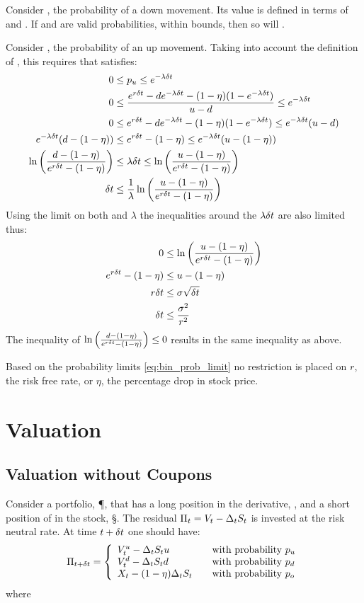 \documentclass[a4paper,11pt,oneside]{report}
\theoremstyle{plain}
\theoremstyle{definition}
\begin{document}
Consider \pd, the probability of a down movement.  Its value is defined in terms of \pu and \po.  If \pu and \po are valid probabilities, within bounds, then so will \pd.

Consider \pu, the probability of an up movement.  Taking into account the definition of \pd, this requires that \pu satisfies:
\begin{align}
 0 &\le p_u \le e^{-\lambda \delta t} \\
 0 &\le \frac{e^{r\delta t} - d e^{-\lambda\delta t} - (1 - \eta)(1 - e^{-\lambda\delta t})}{u - d} \le e^{-\lambda \delta t} \nonumber\\
 0 &\le e^{r\delta t} - d e^{-\lambda\delta t} - (1 - \eta)(1 - e^{-\lambda\delta t}) \le e^{-\lambda \delta t}(u - d) \nonumber\\
 e^{-\lambda\delta t}(d - (1 - \eta)) &\le e^{r\delta t} - (1 - \eta) \le e^{-\lambda\delta t}(u - (1 - \eta)) \nonumber\\
 \ln\left(\frac{d - (1 - \eta)}{e^{r\delta t} - (1 - \eta)}\right) &\le \lambda\delta t \le \ln\left(\frac{u - (1 - \eta)}{e^{r\delta t} - (1 - \eta)}\right) \\
 \delta t &\le \frac{1}{\lambda}\ln\left(\frac{u - (1 - \eta)}{e^{r\delta t} - (1 - \eta)}\right)
\end{align}
Using the limit on both \Dt and $\lambda$ the inequalities around the $\lambda\delta t$ are also limited thus:
\begin{align}
 0 &\le \ln\left(\frac{u - (1 - \eta)}{e^{r\delta t} - (1 - \eta)}\right) \nonumber\\
 e^{r\delta t} - (1 - \eta) &\le u - (1 - \eta) \nonumber\\
 r\delta t &\le \sigma \sqrt{\delta t} \nonumber\\
 \delta t &\le \frac{\sigma^2}{r^2}
\end{align}
The inequality of $\ln\left(\frac{d - (1 - \eta)}{e^{r\delta t} - (1 - \eta)}\right) \le 0$ results in the same inequality as above.

Based on the probability limits \eqref{eq:bin_prob_limit} no restriction is placed on $r$, the risk free rate, or $\eta$, the percentage drop in stock price.


\section{Valuation}

\subsection{Valuation without Coupons}
Consider a portfolio, \P, that has a long position in the derivative, \V, and a short position of \D in the stock, \S.  The residual $\Pi_t = V_t - \Delta_tS_t$ is invested at the risk neutral rate.  At time $t + \delta t$ one should have:
\begin{equation*}
 \PDt =
 \left\{\begin{array}{l@{\qquad\text{with probability }}l}
  \Vu - \D\S u          & \pu \\
  \Vd - \D\S d          & \pd \\
  \X - (1 - \eta)\D\S   & \po \\
 \end{array}\right.
\end{equation*}
where
\end{document}
